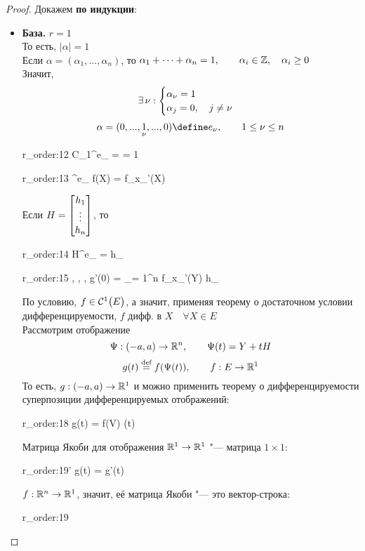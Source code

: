 \begin{proof}
	Докажем \textbf{по индукции}:
	\begin{itemize}
		\item \textbf{База.} $ r = 1 $ \\
		То есть, $ |\alpha| = 1 $ \\
		Если $ \alpha = (\alpha_1, ..., \alpha_n) $, то $ \alpha_1 + \dots + \alpha_n = 1, \qquad \alpha_i \in \Z, \quad \alpha_i \ge 0 $ \\
		Значит,
		$$ \exist \nu :
		\begin{cases}
			\alpha_\nu = 1 \\
			\alpha_j = 0, \quad j \ne \nu
		\end{cases} $$
		$$ \alpha = (0, ..., \underset\nu1, ..., 0) \define e_\nu, \qquad 1 \le \nu \le n $$
		\begin{equ}{r_order:12}
			C_1^{e_\nu} =  = 1
		\end{equ}
		\begin{equ}{r_order:13}
			\partial^{e_\nu} f(X) = f_{x_\nu}'(X)
		\end{equ}
		Если $ H = \column{h_1}{h_n} $, то
		\begin{equ}{r_order:14}
			H^{e_\nu} = h_\nu
		\end{equ}
		\begin{equ}{r_order:15}
			, , ,  \implies g'(0) = \sum_{\nu = 1}^n f_{x_\nu}'(Y) h_\nu
		\end{equ}
		По условию, $ f \in \Cont[1]{E} $, а значит, применяя теорему о достаточном условии дифференцируемости, $ f $ дифф. в $ X \quad \forall X \in E $ \\
		Рассмотрим отображение
		$$ \Psi : (-a, a) \to \R^n, \qquad \Psi(t) = Y + tH $$
		$$ g(t) \bydef f(\Psi(t)), \qquad f : E \to \R^1 $$
		То есть, $ g : (-a, a) \to \R^1 $ и можно применить теорему о дифференцируемости суперпозиции дифференцируемых отображений:
		\begin{equ}{r_order:18}
			g(t) = f(V) \cdot \mathcal{D}\Psi(t)
		\end{equ}
		Матрица Якоби для отображения $ \R^1 \to \R^1 $ "--- матрица $ 1 \times 1 $:
		\begin{equ}{r_order:19'}
			g(t) = g'(t)
		\end{equ}
		$ f : \R^n \to \R^1 $, значит, её матрица Якоби "--- это вектор-строка:
		\begin{equ}{r_order:19}

\end{equ}
\end{itemize}
\end{proof}
